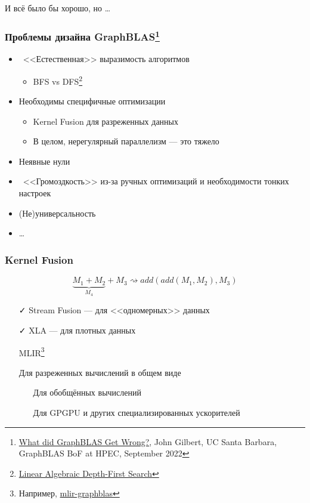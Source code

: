 \documentclass[xcolor=table,aspectratio=169]{beamer}
\begin{document}
\begin{frame}[fragile]
  \begin{center}
  \huge
  И всё было бы хорошо, но \ldots
  \end{center}
\end{frame}

\begin{frame}[fragile]
  \frametitle{Проблемы дизайна GraphBLAS\footnote{\href{https://docs.google.com/document/d/1fMmm-Bmew0wpgJRrjyMHy6G-zPq6R6kQlRum560_4S0/edit?tab=t.0}{What did GraphBLAS Get Wrong?}, John Gilbert, UC Santa Barbara, GraphBLAS BoF at HPEC, September 2022}}
  \begin{itemize}
    \item \ <<Естественная>> выразимость алгоритмов
    \begin{itemize}
      \item BFS vs DFS\footnote{\href{https://dl.acm.org/doi/10.1145/3315454.3329962}{Linear Algebraic Depth-First Search}}
    \end{itemize}
    \item Необходимы специфичные оптимизации
    \begin{itemize}
      \item Kernel Fusion для разреженных данных
      \item В целом, нерегулярный параллелизм --- это тяжело
    \end{itemize}  
    \item Неявные нули
    \item \ <<Громоздкость>> из-за ручных оптимизаций и необходимости тонких настроек    
    \item (Не)универсальность
    \item \ldots
  \end{itemize}
\end{frame}

\begin{frame}[fragile]
  \frametitle{Kernel Fusion}
  \begin{center}
    \[
    \underbrace{M_1 + M_2}_{M_4} + M_3 	\rightsquigarrow add(add(M_1,M_2), M_3)
    \]
  \end{center}
  \begin{itemize}
    \item[\faCheck] Stream Fusion --- для <<одномерных>> данных
    \item[\faCheck] XLA --- для плотных данных
    \item[\faGears] MLIR\footnote{Например, \href{https://mlir-graphblas.readthedocs.io/en/latest/}{mlir-graphblas}}
    \item[\faQuestion] Для разреженных вычислений в общем виде
    \begin{itemize}
      \item[\faFrownO] Для обобщённых вычислений
      \item[\faFrownO] Для GPGPU и других специализированных ускорителей
    \end{itemize}  
  \end{itemize}
\end{frame}
\end{document}
